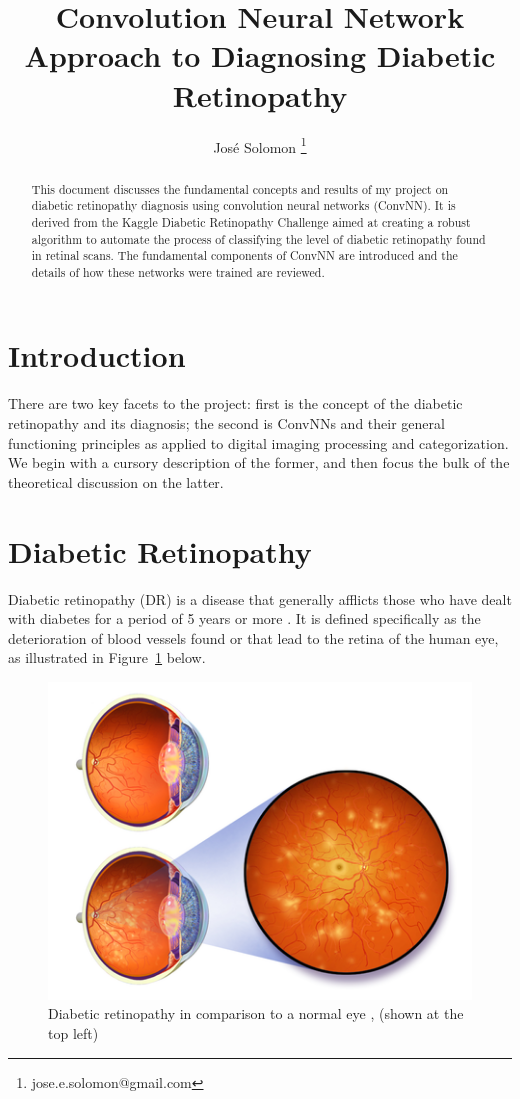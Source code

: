 \documentclass[letterpaper,12pt]{article}
\title{Convolution Neural Network Approach to Diagnosing Diabetic Retinopathy}
\author{Jos\'e Solomon \thanks{jose.e.solomon@gmail.com} }
\date{}
\newcommand{\figref}[1]{Figure~\ref{#1}}
\begin{document}
\maketitle
\begin{abstract}
This document discusses the fundamental concepts and results of my project on diabetic retinopathy diagnosis using convolution neural networks (ConvNN). It is derived from the Kaggle Diabetic Retinopathy Challenge \cite{kaggle} aimed at creating a robust algorithm to automate the process of classifying the level of diabetic retinopathy found in retinal scans. The fundamental components of ConvNN are introduced and the details of how these networks were trained are reviewed.
\end{abstract}
\tableofcontents

\section{Introduction}

There are two key facets to the project: first is the concept of the diabetic retinopathy and its diagnosis; the second is ConvNNs and their general functioning principles as applied to digital imaging processing and categorization. We begin with a cursory description of the former, and then focus the bulk of the theoretical discussion on the latter.

\section{Diabetic Retinopathy}

Diabetic retinopathy (DR) is a disease that generally afflicts those who have dealt with diabetes for a period of 5 years or more \cite{nih}. It is defined specifically as the deterioration of blood vessels found or that lead to the retina of the human eye, as illustrated in \figref{eye} below.

\begin{figure}[htbp]
\begin{center}
\includegraphics[scale=0.6]{images/illustration.png}
\caption{Diabetic retinopathy in comparison to a normal eye \cite{wiki}, (shown at the top left)}
\label{eye}
\end{center}
\end{figure}
\end{document}
